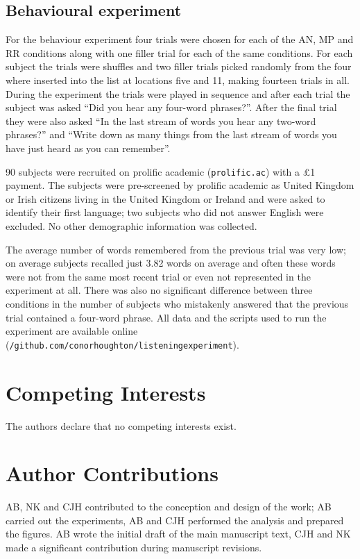 \documentclass[10pt,letterpaper]{article}
\begin{document}
\subsection*{Behavioural experiment}

For the behaviour experiment four trials were chosen for each of the
AN, MP and RR conditions along with one filler trial for each of the
same conditions. For each subject the trials were shuffles and two
filler trials picked randomly from the four where inserted into the
list at locations five and 11, making fourteen trials in all. During
the experiment the trials were played in sequence and after each trial
the subject was asked ``Did you hear any four-word phrases?''. After
the final trial they were also asked ``In the last stream of words you
hear any two-word phrases?'' and ``Write down as many things from the
last stream of words you have just heard as you can remember''.

90 subjects were recruited on prolific academic (\texttt{prolific.ac}) with a £1 payment. The subjects were pre-screened by prolific academic as United Kingdom or Irish citizens living in the United Kingdom or Ireland and were asked to identify their first language; two subjects who did not answer English were excluded. No other demographic information was collected. 

The average number of words remembered from the previous trial was very low; on average subjects recalled just 3.82 words on average and often these words were not from the same most recent trial or even not represented in the experiment at all. There was also no significant difference between three conditions in the number of subjects who mistakenly answered that the previous trial contained a four-word phrase. All data and the scripts used to run the experiment are available online (\texttt{/github.com/conorhoughton/listening\textunderscore experiment}).  

\section*{Competing Interests}
The authors declare that no competing interests exist.



\section*{Author Contributions}
AB, NK and CJH contributed to the conception and design of the work;
AB carried out the experiments, AB and CJH performed the analysis and
prepared the figures. AB wrote the initial draft of the main
manuscript text, CJH and NK made a significant contribution during
manuscript revisions.
\end{document}
